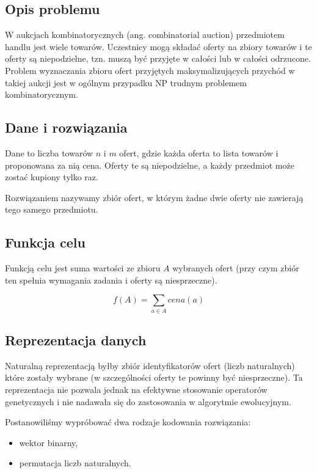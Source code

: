\subsection{Opis problemu}
W aukcjach kombinatorycznych (ang. combinatorial auction) przedmiotem handlu jest wiele towarów.
Uczestnicy mogą składać oferty na zbiory towarów i te oferty są niepodzielne, tzn. muszą być przyjęte w całości lub w całości odrzucone. Problem wyznaczania zbioru ofert przyjętych maksymalizujących
        przychód w takiej aukcji jest w ogólnym przypadku NP trudnym problemem kombinatorycznym.

\subsection{Dane i rozwiązania}
Dane to liczba towarów $n$ i $m$ ofert, gdzie każda oferta to lista towarów i proponowana za nią cena.
Oferty te są niepodzielne, a każdy przedmiot może zostać kupiony tylko raz.


Rozwiązaniem nazywamy zbiór ofert, w którym żadne dwie oferty nie zawierają tego samego przedmiotu.

\subsection{Funkcja celu}
Funkcją celu jest suma wartości ze zbioru $A$ wybranych ofert (przy czym zbiór ten spełnia wymagania zadania i oferty są niesprzeczne).

\begin{equation}
    f(A) = \sum\limits_{a \in A} cena(a)
\end{equation}

\subsection{Reprezentacja danych}
Naturalną reprezentacją byłby zbiór identyfikatorów ofert (liczb naturalnych) które zostały wybrane (w szczególności oferty te powinny być niesprzeczne). Ta reprezentacja nie pozwala jednak na efektywne stosowanie operatorów genetycznych i nie nadawała się do zastosowania w algorytmie ewolucyjnym.

\newpage

Postanowiliśmy wypróbować dwa rodzaje kodowania rozwiązania:
\begin{itemize}
    \item wektor binarny,
    \item permutacja liczb naturalnych.
\end{itemize}

